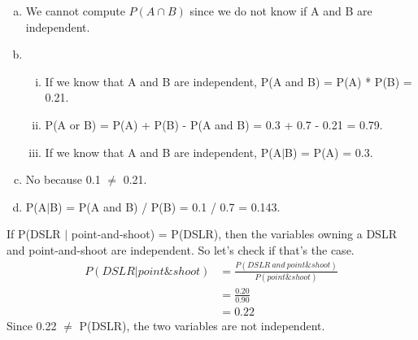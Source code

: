 {
\begin{enumerate}[(a)]
\setlength{\itemsep}{0mm}
\item We cannot compute $P(A \cap B)$ since we do not know if A and B are independent.
\item
\begin{enumerate}[(i)]
\setlength{\itemsep}{0mm}
\item If we know that A and B are independent, P(A and B) = P(A) * P(B) = 0.21.
\item P(A or B) = P(A) + P(B) - P(A and B) =  0.3 + 0.7 - 0.21 = 0.79.
\item If we know that A and B are independent, P(A$|$B) = P(A) = 0.3. 
\end{enumerate}
\item No because 0.1 $\ne$ 0.21.
\item P(A$|$B) = P(A and B) / P(B) = 0.1 / 0.7 = 0.143.
\end{enumerate}
}


{
{
If P(DSLR $|$ point-and-shoot) = P(DSLR), then the variables owning a DSLR and point-and-shoot are independent. So let's check if that's the case. \\
\begin{align*}
P(DSLR | point\&shoot) &= \frac{P(DSLR~and~point\&shoot)}{P(point\&shoot)} \\
&= \frac{0.20}{0.90} \\
&= 0.22
\end{align*}
Since 0.22 $\ne$ P(DSLR), the two variables are not independent.
}
}

